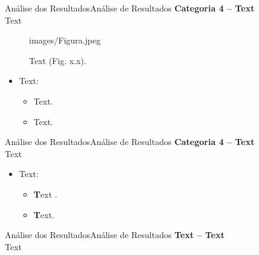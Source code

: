 \documentclass[8pt,aspectratio = 1610]{beamer}
\begin{document}
\begin{frame}{Análise dos Resultados}{Análise de Resultados}
\textbf{Categoria 4 – Text}\\
Text 

\begin{figure}[ht] %
	\begin{center}
 
images/Figura.jpeg

    \caption{Text (Fig. x.x).}
    \end{center}
\end{figure}
\begin{itemize}
    \item Text:
    \begin{itemize}
        \item Text.
        \item Text.
    \end{itemize}
\end{itemize} 

\end{frame}

\begin{frame}{Análise dos Resultados}{Análise de Resultados}
\textbf{Categoria 4 – Text}\\
Text


\begin{itemize}
    \item Text:
    \begin{itemize}
        \item \textbf Text \cite{Da_Republica_undated-vx} .
        \item \textbf Text.
    \end{itemize}
\end{itemize} 
\end{frame}

\begin{frame}{Análise dos Resultados}{Análise de Resultados}
\textbf{Text – Text}\\
Text


\end{frame}
\end{document}
